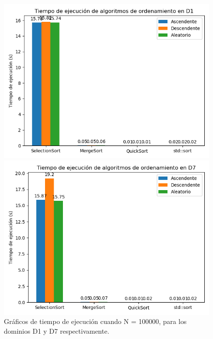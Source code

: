 \begin{figure}[H]
    \centering
    \begin{minipage}[t]{0.5\textwidth}
        \includegraphics[width=\textwidth]{../code/sorting/data/plots/100000_D1.png}
    \end{minipage}%
    \begin{minipage}[t]{0.5\textwidth}
        \includegraphics[width=\textwidth]{../code/sorting/data/plots/100000_D7.png}
     \end{minipage}%
    \caption{Gráficos de tiempo de ejecución cuando N = 100000, para los dominios D1 y D7 respectivamente.}
    \label{fig:sortingN100000}
\end{figure}

